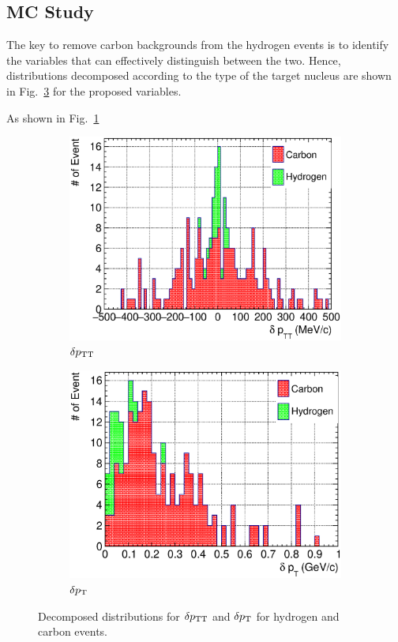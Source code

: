 \subsection{MC Study}
\label{sec:mc-hydrogen-ana}
     The key to remove carbon backgrounds from the hydrogen events is to identify the variables that can effectively distinguish between the two.
     Hence, distributions decomposed according to the type of the target nucleus are shown in Fig.~\ref{fig:hsel-tki-decomp} for the proposed variables.

     As shown in Fig.~\ref{subfig:hsel-dptt-stack}
     \begin{figure}
     \begin{subfigure}[b]{\dbfigwid\textwidth}
          \centering
          \includegraphics[width=\textwidth]{figures/perf/tki/SFGpTPCmu_dptt_stack_al15.eps}
          \caption{$\delta p_\textrm{TT}$}
          \label{subfig:hsel-dptt-stack}
     \end{subfigure}
     \begin{subfigure}[b]{\dbfigwid\textwidth}
          \centering
          \includegraphics[width=\textwidth]{figures/perf/tki/SFGpTPCmu_dpt_stack_al15.eps}
          \caption{$\delta p_\textrm{T}$}
          \label{subfig:hsel-dpt-stack}
     \end{subfigure}
     \caption{Decomposed distributions for $\delta p_\textrm{TT}$ and $\delta p_\textrm{T}$ for hydrogen and carbon events.}
     \label{fig:hsel-tki-decomp}
     \end{figure}
